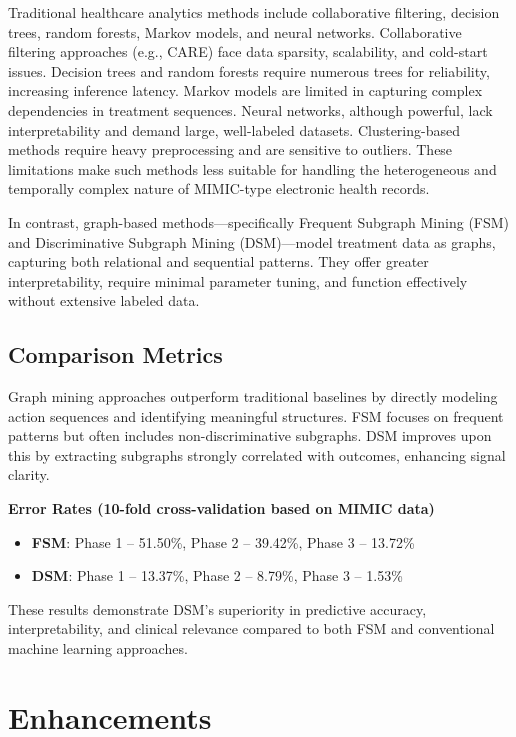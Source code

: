 \documentclass[11pt]{article}
\begin{document}
Traditional healthcare analytics methods include collaborative filtering, decision trees, random forests, Markov models, and neural networks. Collaborative filtering approaches (e.g., CARE) face data sparsity, scalability, and cold-start issues. Decision trees and random forests require numerous trees for reliability, increasing inference latency. Markov models are limited in capturing complex dependencies in treatment sequences. Neural networks, although powerful, lack interpretability and demand large, well-labeled datasets. Clustering-based methods require heavy preprocessing and are sensitive to outliers. These limitations make such methods less suitable for handling the heterogeneous and temporally complex nature of MIMIC-type electronic health records.

In contrast, graph-based methods—specifically Frequent Subgraph Mining (FSM) and Discriminative Subgraph Mining (DSM)—model treatment data as graphs, capturing both relational and sequential patterns. They offer greater interpretability, require minimal parameter tuning, and function effectively without extensive labeled data.

\subsection*{Comparison Metrics}

Graph mining approaches outperform traditional baselines by directly modeling action sequences and identifying meaningful structures. FSM focuses on frequent patterns but often includes non-discriminative subgraphs. DSM improves upon this by extracting subgraphs strongly correlated with outcomes, enhancing signal clarity.

\textbf{Error Rates (10-fold cross-validation based on MIMIC data)}
\begin{itemize}[noitemsep]
  \item \textbf{FSM}: Phase 1 – 51.50\%, Phase 2 – 39.42\%, Phase 3 – 13.72\%
  \item \textbf{DSM}: Phase 1 – 13.37\%, Phase 2 – 8.79\%, Phase 3 – 1.53\%
\end{itemize}

These results demonstrate DSM’s superiority in predictive accuracy, interpretability, and clinical relevance compared to both FSM and conventional machine learning approaches.

\section{Enhancements}
\end{document}
